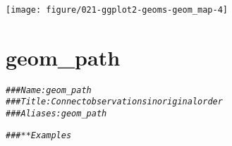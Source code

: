 \documentclass[a4paper,titlepage]{tufte-handout}\usepackage[]{graphicx}\usepackage[]{color}
\makeatletter
\def\maxwidth{ %
  \ifdim\Gin@nat@width>\linewidth
    \linewidth
  \else
    \Gin@nat@width
  \fi
}
\newcommand{\hlcom}[1]{\textcolor[rgb]{0.678,0.584,0.686}{\textit{#1}}}%
\newenvironment{kframe}{%
 \def\at@end@of@kframe{}%
 \ifinner\ifhmode%
  \def\at@end@of@kframe{\end{minipage}}%
  \begin{minipage}{\columnwidth}%
 \fi\fi%
 \def\FrameCommand##1{\hskip\@totalleftmargin \hskip-\fboxsep
 \colorbox{shadecolor}{##1}\hskip-\fboxsep
     \hskip-\linewidth \hskip-\@totalleftmargin \hskip\columnwidth}%
 \MakeFramed {\advance\hsize-\width
   \@totalleftmargin\z@ \linewidth\hsize
   \@setminipage}}%
 {\par\unskip\endMakeFramed%
 \at@end@of@kframe}
\newenvironment{knitrout}{}{} %
\makeatother
\begin{document}
\begin{knitrout}
\begin{kframe}
{\ttfamily\noindent\itshape\color{messagecolor}{\#\# Loading required package: maps}}\end{kframe}
\texttt{[image: figure/021-ggplot2-geoms-geom\_map-4]} 

\end{knitrout}


\section{geom\_path}

\begin{knitrout}
\color{fgcolor}\begin{kframe}
\begin{alltt}
\hlcom{### Name: geom_path}
\hlcom{### Title: Connect observations in original order}
\hlcom{### Aliases: geom_path}

\hlcom{### ** Examples}


\end{alltt}
\end{kframe}
\end{knitrout}
\end{document}
